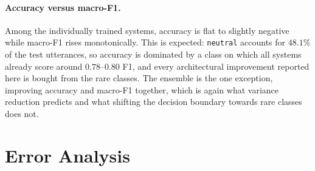 \documentclass[sigconf,nonacm]{acmart}
\begin{document}
\paragraph{Accuracy versus macro-F1.}
Among the individually trained systems, accuracy is flat to slightly negative while macro-F1
rises monotonically. This is expected: \texttt{neutral} accounts for
$48.1\%$ of the test utterances, so accuracy is dominated by a class on which all systems
already score around $0.78$--$0.80$ F1, and every architectural improvement reported here is
bought from the rare classes. The ensemble is the one exception, improving accuracy and
macro-F1 together, which is again what variance reduction predicts and what shifting the
decision boundary towards rare classes does not.

\section{Error Analysis}
\end{document}
